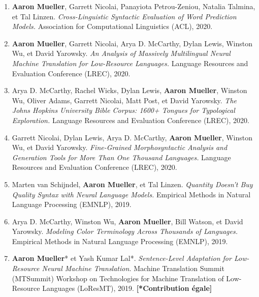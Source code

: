 \documentclass[10pt]{article}
\begin{document}
	\begin{enumerate}[leftmargin=*, topsep=0pt, itemsep=-1ex, partopsep=0ex, parsep=1ex]

	\item \textbf{Aaron Mueller}, Garrett Nicolai, Panayiota Petrou-Zeniou, Natalia Talmina, et Tal Linzen. \emph{Cross-Linguistic Syntactic Evaluation of Word Prediction Models.} Association for Computational Linguistics (ACL), 2020.

	\item \textbf{Aaron Mueller}, Garrett Nicolai, Arya D. McCarthy, Dylan Lewis, Winston Wu, et David Yarowsky. \emph{An Analysis of Massively Multilingual Neural Machine Translation for Low-Resource Languages.} Language Resources and Evaluation Conference (LREC), 2020.

	\item Arya D. McCarthy, Rachel Wicks, Dylan Lewis, \textbf{Aaron Mueller}, Winston Wu, Oliver Adams, Garrett Nicolai, Matt Post, et David Yarowsky. \emph{The Johns Hopkins University Bible Corpus: 1600+ Tongues for Typological Exploration.} Language Resources and Evaluation Conference (LREC), 2020.

	\item Garrett Nicolai, Dylan Lewis, Arya D. McCarthy, \textbf{Aaron Mueller}, Winston Wu, et David Yarowsky. \emph{Fine-Grained Morphosyntactic Analysis and Generation Tools for More Than One Thousand Languages.} Language Resources and Evaluation Conference (LREC), 2020.

	\item Marten van Schijndel, \textbf{Aaron Mueller}, et Tal Linzen. \emph{Quantity Doesn't Buy Quality Syntax with Neural Language Models.} Empirical Methods in Natural Language Processing (EMNLP), 2019.

	\item Arya D. McCarthy, Winston Wu, \textbf{Aaron Mueller}, Bill Watson, et David Yarowsky. \emph{Modeling Color Terminology Across Thousands of Languages.} Empirical Methods in Natural Language Processing (EMNLP), 2019.

	\item \textbf{Aaron Mueller}* et Yash Kumar Lal*. \emph{Sentence-Level Adaptation for Low-Resource Neural Machine Translation.} Machine Translation Summit (MTSummit) Workshop on Technologies for Machine Translation of Low-Resource Languages (LoResMT), 2019. \textbf{[*Contribution égale]}

	\end{enumerate}
\end{document}

